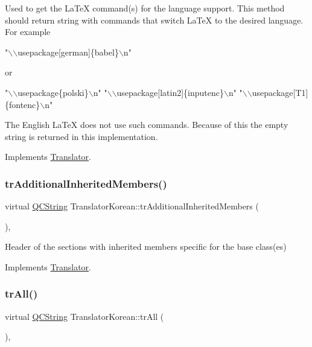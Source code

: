 Used to get the La\+TeX command(s) for the language support. This method should return string with commands that switch La\+TeX to the desired language. For example 
\begin{DoxyPre}"\(\backslash\)\(\backslash\)usepackage[german]\{babel\}\(\backslash\)n"
 \end{DoxyPre}
 or 
\begin{DoxyPre}"\(\backslash\)\(\backslash\)usepackage\{polski\}\(\backslash\)n"
 "\(\backslash\)\(\backslash\)usepackage[latin2]\{inputenc\}\(\backslash\)n"
 "\(\backslash\)\(\backslash\)usepackage[T1]\{fontenc\}\(\backslash\)n"
 \end{DoxyPre}


The English La\+TeX does not use such commands. Because of this the empty string is returned in this implementation. 

Implements \mbox{\hyperlink{class_translator}{Translator}}.

\mbox{\label{class_translator_korean_a096ae3361ae83defe9af3576640f046e}} 
\subsubsection{\texorpdfstring{trAdditionalInheritedMembers()}{trAdditionalInheritedMembers()}}
{\footnotesize\ttfamily virtual \mbox{\hyperlink{class_q_c_string}{Q\+C\+String}} Translator\+Korean\+::tr\+Additional\+Inherited\+Members (\begin{DoxyParamCaption}{ }\end{DoxyParamCaption})\hspace{0.3cm}{\ttfamily [inline]}, {\ttfamily [virtual]}}

Header of the sections with inherited members specific for the base class(es) 

Implements \mbox{\hyperlink{class_translator}{Translator}}.

\mbox{\label{class_translator_korean_a96bcbf48971de0f72c00acfca3fee9ca}} 
\subsubsection{\texorpdfstring{trAll()}{trAll()}}
{\footnotesize\ttfamily virtual \mbox{\hyperlink{class_q_c_string}{Q\+C\+String}} Translator\+Korean\+::tr\+All (\begin{DoxyParamCaption}{ }\end{DoxyParamCaption})\hspace{0.3cm}{\ttfamily [inline]}, {\ttfamily [virtual]}}

